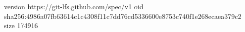 version https://git-lfs.github.com/spec/v1
oid sha256:4986a07fb63614c1c4308f11c7dd76cd5336600e8753c740f1e268ecaea379c2
size 174916

